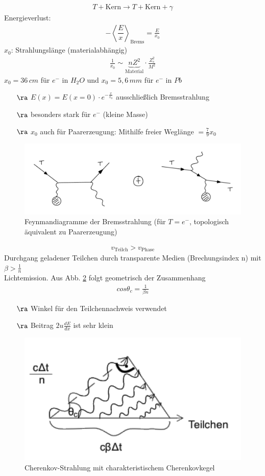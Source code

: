 	\begin{align}
	\boxed{T+ \text{Kern}\rightarrow T+ \text{Kern}+\gamma}
	\end{align}
Energieverlust:
	\begin{align}
	\boxed{-\left\langle \dfrac{E}{x}\right\rangle_{\text{Brems}}=\frac{E}{x_0}}
	\end{align}
$x_0$: Strahlungslänge (materialabhängig)
	\begin{align}
	\boxed{\frac{1}{x_0}\sim \underbrace{nZ^2}_{\text{Material}} \cdot \frac{Z^2_s}{M^2}}
	\end{align}
$x_0=36\,cm$ für $e^-$ in $H_2O$ und $x_0=5,6\,mm$ für $e^-$ in $Pb$
\begin{itemize}
\item[$\ra$] $E(x)=E(x=0)\cdot e^{-\frac{x}{x_0}}$ ausschließlich Bremsstrahlung
\item[$\ra$] besonders stark für $e^-$ (kleine Masse)
\item[$\ra$] $x_0$ auch für Paarerzeugung: Mithilfe freier Weglänge $=\frac{7}{9}x_0$
\end{itemize}

	\begin{figure}[!ht]
	\centering
	\includegraphics[width=.6\textwidth]{imgs/ep5-fig-3-10.pdf}
	\caption{Feynmandiagramme der Bremsstrahlung (für $T=e^-$, \glqq topologisch äquivalent zu Paarerzeugung\grqq ) \label{fig:3.10}}
	\end{figure}

	\begin{align}
	v_{\text{Teilch}}>v_{\text{Phase}}
	\end{align}
Durchgang geladener Teilchen durch transparente Medien (Brechungsindex n) mit $\beta >\frac{1}{n}$\\
Lichtemission. Aus Abb. \ref{fig:3.11} folgt geometrisch der Zusammenhang
\begin{align}
\boxed{cos\theta_c=\frac{1}{\beta n}}
\end{align}
\begin{itemize}
\item[$\ra$] Winkel für den Teilchennachweis verwendet
\item[$\ra$] Beitrag $2u\frac{dE}{dx}$ ist sehr klein
\end{itemize}
	\begin{figure}[!ht]
	\centering
	\includegraphics[width=.5\textwidth]{imgs/ep5-fig-3-11.pdf}
	\caption{Cherenkov-Strahlung mit charakteristischem Cherenkovkegel \label{fig:3.11}}
	\end{figure}

